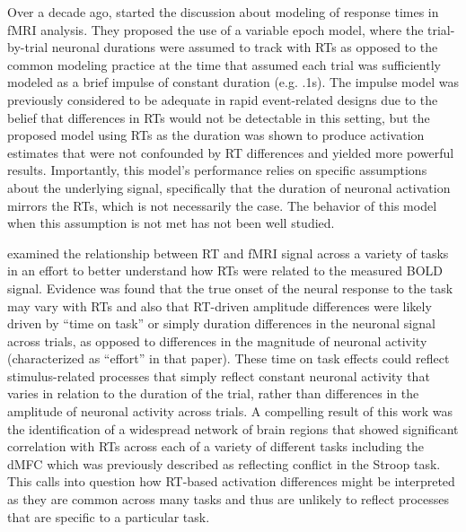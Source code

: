 \documentclass[titlepage,12pt] {article}
\begin{document}
Over a decade ago,  \citet{grinband_detection_2008} started the discussion about modeling of response times in fMRI analysis.  They proposed the use of a variable epoch model, where the trial-by-trial neuronal durations were assumed to track with RTs as opposed to the common modeling practice at the time that assumed each trial was sufficiently modeled as a brief impulse of constant duration (e.g. .1s).  The impulse model was previously considered to be adequate in rapid event-related designs due to the belief that differences in RTs would not be detectable in this setting, but the proposed model using RTs as the duration was shown to produce activation estimates that were not confounded by RT differences and yielded more powerful results.  Importantly, this model's performance relies on specific assumptions about the underlying signal, specifically that the duration of neuronal activation mirrors the RTs, which is not necessarily the case.  The behavior of this model when this assumption is not met has not been well studied.

\citet{yarkoni_bold_2009} examined the relationship between RT and fMRI signal across a variety of tasks in an effort to better understand how RTs were related to the measured BOLD signal.  Evidence was found that the true onset of the neural response to the task may vary with RTs and also that RT-driven amplitude differences were likely driven by ``time on task'' or simply duration differences in the neuronal signal across trials, as opposed to differences in the magnitude of neuronal activity (characterized as ``effort'' in that paper).  These time on task effects could reflect stimulus-related processes that simply reflect constant neuronal activity that varies in relation to the duration of the trial, rather than differences in the amplitude of neuronal activity across trials.  A compelling result of this work was the identification of a widespread network of brain regions that showed significant correlation with RTs across each of a variety of different tasks including the dMFC which was previously described as reflecting conflict in the Stroop task.  This calls into question how RT-based activation differences might be interpreted as they are common across many tasks and thus are unlikely to reflect processes that are specific to a particular task.  
\end{document}
